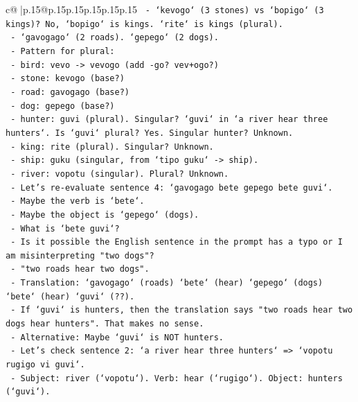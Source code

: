 \documentclass{article}
\begin{document}
{\begin{supertabular}{c@{$\;$}|p{.15\linewidth}@{}p{.15\linewidth}p{.15\linewidth}p{.15\linewidth}p{.15\linewidth}p{.15\linewidth}}
{{{\texttt{         {-} `kevogo` (3 stones) vs `bopigo` (3 kings)? No, `bopigo` is kings. `rite` is kings (plural).} \\
\texttt{         {-} `gavogago` (2 roads). `gepego` (2 dogs).} \\
\texttt{         {-} Pattern for plural:} \\
\texttt{           {-} bird: vevo {-}> vevogo (add {-}go? vev+ogo?)} \\
\texttt{           {-} stone: kevogo (base?)} \\
\texttt{           {-} road: gavogago (base?)} \\
\texttt{           {-} dog: gepego (base?)} \\
\texttt{           {-} hunter: guvi (plural). Singular? `guvi` in `a river hear three hunters`. Is `guvi` plural? Yes. Singular hunter? Unknown.} \\
\texttt{           {-} king: rite (plural). Singular? Unknown.} \\
\texttt{           {-} ship: guku (singular, from `tipo guku` {-}> ship).} \\
\texttt{           {-} river: vopotu (singular). Plural? Unknown.} \\
\texttt{       {-} Let's re{-}evaluate sentence 4: `gavogago bete gepego bete guvi`.} \\
\texttt{         {-} Maybe the verb is `bete`.} \\
\texttt{         {-} Maybe the object is `gepego` (dogs).} \\
\texttt{         {-} What is `bete guvi`?} \\
\texttt{         {-} Is it possible the English sentence in the prompt has a typo or I am misinterpreting "two dogs"?} \\
\texttt{         {-} "two roads hear two dogs".} \\
\texttt{         {-} Translation: `gavogago` (roads) `bete` (hear) `gepego` (dogs) `bete` (hear) `guvi` (??).} \\
\texttt{         {-} If `guvi` is hunters, then the translation says "two roads hear two dogs hear hunters". That makes no sense.} \\
\texttt{         {-} Alternative: Maybe `guvi` is NOT hunters.} \\
\texttt{         {-} Let's check sentence 2: `a river hear three hunters` => `vopotu rugigo vi guvi`.} \\
\texttt{           {-} Subject: river (`vopotu`). Verb: hear (`rugigo`). Object: hunters (`guvi`).} \\
}}}
\end{supertabular}}
\end{document}

